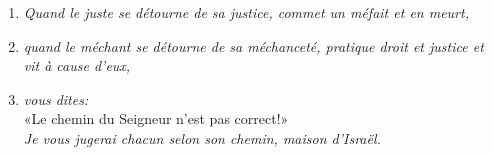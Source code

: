 \begin{enumerate}[leftmargin=\psleftmargin, labelsep = \pslabelsep, label={\arabic*}, font=\color{\pscolor}\small\textsuperscript, parsep=0em, itemsep=0em, topsep=0em ]
        «Le chemin du Seigneur n’est pas correct!»; \\
        \textit{mais n’est-ce pas leur chemin à eux qui n’est pas correct?}
  \item {}\textit{Quand le juste se détourne de sa justice, commet un méfait et en meurt,}
  \item {}\textit{quand le méchant se détourne de sa méchanceté, \brk
          pratique droit et justice et vit à cause d’eux,}
  \item {}\textit{vous dites:}\\
        «Le chemin du Seigneur n’est pas correct!» \\
        \textit{Je vous jugerai chacun selon son chemin, maison d’Israël.} \newpage



\end{enumerate}
